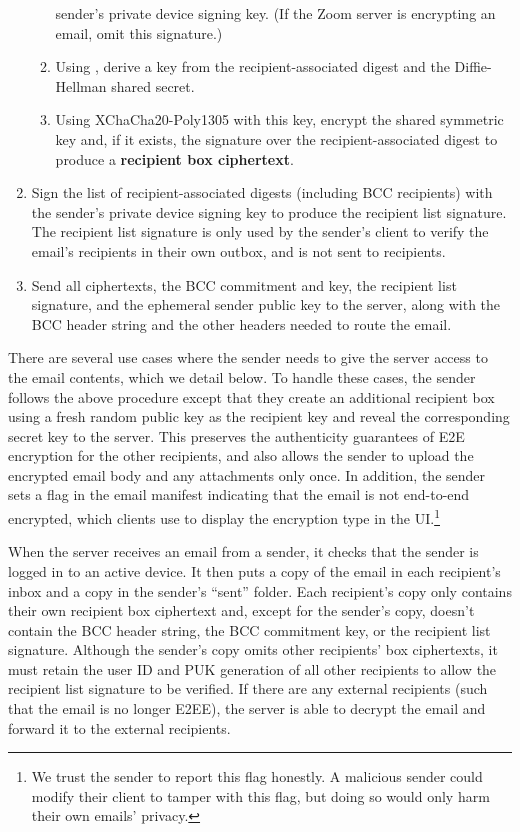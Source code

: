 \begin{enumerate}
\begin{enumerate}
sender's private device signing key. (If the Zoom server is encrypting an email, omit this
signature.)
\item Using \HMACSHATWO, derive a key from the recipient-associated digest and the Diffie-Hellman
shared secret.
\item Using XChaCha20-Poly1305 with this key, encrypt the shared symmetric key and, if it exists,
the signature over the recipient-associated digest to produce a \textbf{recipient box ciphertext}.
\end{enumerate}
\item Sign the list of recipient-associated digests (including BCC recipients) with the sender's
private device signing key to produce the recipient list signature. The recipient list signature is
only used by the sender's client to verify the email's recipients in their own outbox, and is not
sent to recipients.
\item Send all ciphertexts, the BCC commitment and key, the recipient list signature, and the
ephemeral sender public key to the server, along with the BCC header string and the other headers
needed to route the email.
\end{enumerate}

There are several use cases where the sender needs to give the server access to the email contents,
which we detail below. To handle these cases, the sender follows the above procedure except that
they create an additional recipient box using a fresh random public key as the recipient key and
reveal the corresponding secret key to the server. This preserves the authenticity guarantees of E2E
encryption for the other recipients, and also allows the sender to upload the encrypted email body
and any attachments only once. In addition, the sender sets a flag in the email manifest indicating
that the email is not end-to-end encrypted, which clients use to display the encryption type in the
UI.\footnote{We trust the sender to report this flag honestly. A malicious sender could modify their
client to tamper with this flag, but doing so would only harm their own emails' privacy.}

When the server receives an email from a sender, it checks that the sender is logged in to an active
device. It then puts a copy of the email in each recipient's inbox and a copy in the sender's
``sent'' folder. Each recipient's copy only contains their own recipient box ciphertext and, except
for the sender's copy, doesn't contain the BCC header string, the BCC commitment key, or the
recipient list signature. Although the sender's copy omits other recipients' box ciphertexts, it
must retain the user ID and PUK generation of all other recipients to allow the recipient list
signature to be verified. If there are any external recipients (such that the email is no longer
E2EE), the server is able to decrypt the email and forward it to the external recipients.

